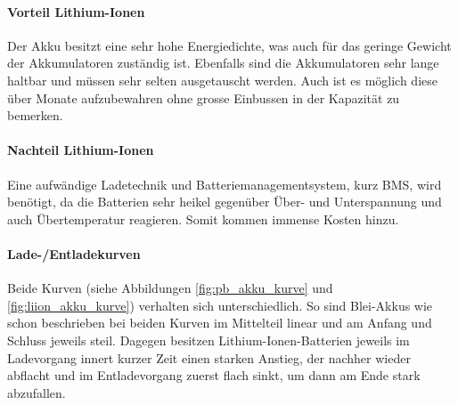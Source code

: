 \paragraph{Vorteil Lithium-Ionen}

Der Akku besitzt eine sehr hohe Energiedichte, was auch für das geringe Gewicht der Akkumulatoren zuständig ist. Ebenfalls sind die Akkumulatoren sehr lange haltbar und müssen sehr selten ausgetauscht werden. Auch ist es möglich diese über Monate aufzubewahren ohne grosse Einbussen in der Kapazität zu bemerken.

\paragraph{Nachteil Lithium-Ionen}

Eine aufwändige Ladetechnik und Batteriemanagementsystem, kurz BMS, wird benötigt, da die Batterien sehr heikel gegenüber Über- und Unterspannung und auch Übertemperatur reagieren. Somit kommen immense Kosten hinzu.

\paragraph{Lade-/Entladekurven}

Beide Kurven (siehe Abbildungen \ref{fig:pb_akku_kurve} und \ref{fig:liion_akku_kurve}) verhalten sich unterschiedlich. So sind Blei-Akkus wie schon beschrieben bei beiden Kurven im Mittelteil linear und am Anfang und Schluss jeweils steil. Dagegen besitzen Lithium-Ionen-Batterien jeweils im Ladevorgang innert kurzer Zeit einen starken Anstieg, der nachher wieder abflacht und im Entladevorgang zuerst flach sinkt, um dann am Ende stark abzufallen.

